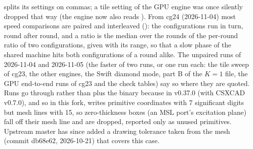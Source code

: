 splits its settings on commas; a tile setting  of the GPU engine was once silently dropped that way (the
engine now also reads ). From cg24 (2026-11-04) most speed comparisons are paired and interleaved ():
the configurations run in turn, round after round, and a ratio is the median over the rounds of the per-round ratio
of two configurations, given with its range, so that a slow phase of the shared machine hits both configurations of
a round alike. The unpaired runs of 2026-11-04 and 2026-11-05 (the faster of two runs, or one run each: the tile
sweep of cg23, the other engines, the Swift diamond mode, part B of the $K=1$ file, the GPU end-to-end runs of cg23
and the check tables) say so where they are quoted.
Runs go through
 rather than  plus the binary because in v0.37.0 (with CSXCAD v0.7.0), and so in this
fork,  writes primitive coordinates with 7 significant digits but mesh lines with 15, so
zero-thickness boxes (an MSL port's excitation plane) fall off their mesh line and are dropped, reported only as
unused primitives. Upstream master has since added a drawing tolerance taken from the mesh (commit db68e62,
2026-10-21) that covers this case.

